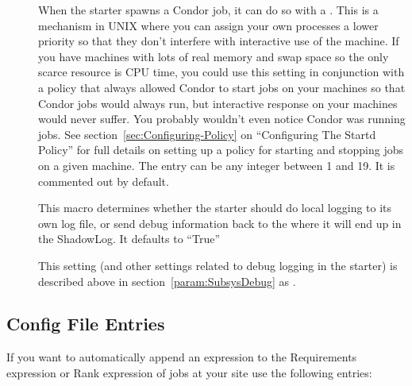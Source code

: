 \begin{description}

\item[] \label{param:JobReniceIncrement}
  When the starter spawns a Condor job, it can do so with a
  .  This is a mechanism in UNIX where you can assign
  your own processes a lower priority so that they don't interfere
  with interactive use of the machine.  If you have machines with lots
  of real memory and swap space so the only scarce resource is CPU
  time, you could use this setting in conjunction with a policy that
  always allowed Condor to start jobs on your machines so that Condor
  jobs would always run, but interactive response on your machines
  would never suffer.  You probably wouldn't even notice Condor was
  running jobs.  See section~\ref{sec:Configuring-Policy} on
  ``Configuring The Startd Policy'' for full details on setting up a
  policy for starting and stopping jobs on a given machine.  The entry
  can be any integer between 1 and 19.  It is commented out by
  default.

\item[]
  \label{param:StarterLocalLogging} This macro determines whether the
  starter should do local logging to its own log file, or send debug
  information back to the  where it will end up in the
  ShadowLog.  It defaults to ``True''

\item[] \label{param:StarterDebug} This setting
  (and other settings related to debug logging in the starter) is
  described above in section~\ref{param:SubsysDebug} as
  .

\end{description}

\subsection{ Config File Entries}
\label{sec:Submit-Config-File-Entries}

If you want  to automatically append an expression to
the Requirements expression or Rank expression of jobs at your site
use the following entries:

